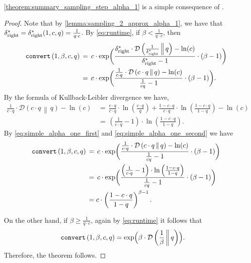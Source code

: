 \documentclass[letterpaper,11pt]{article}
\newcommand{\1}[1]{\mathds{1}\left[#1\right]}
\newcommand{\runtime}[1][\alpha, \beta, c, q]{\textnormal{\texttt{convert}}\left(#1\right)}
\newcommand{\D}[2]{\mathcal{D}\left(#1\, \middle\|\,#2 \right)}
\newcommand{\sdeltar}{\delta^{*}_{\textnormal{right}}}
\begin{document}
 \cref{theorem:summary_sampling_step_alpha_1} is a simple consequence of .
 \simpslaphaone*
\begin{proof}
	Note that by \cref{lemma:sampling_2_approx_alpha_1}, we have that $\sdeltar=\sdeltar(1,c,q) = \frac{1}{q \cdot c}$.
	By \eqref{eq:runtime}, if $\beta < \frac{1}{q \cdot c}$, then 
	\begin{equation}
		\label{eq:simple_alpha_one_first}
	\begin{aligned}
	\runtime[1,\beta,c,q]\,&=\, c \cdot \exp\biggl(\frac{ \sdeltar \cdot \D{\frac{1}{\sdeltar}}{q}- \ln(c) }{\sdeltar - 1} \cdot \left( \beta - 1 \right) \biggr) \\
	&=\,  c \cdot \exp\biggl(\frac{ \frac{1}{c\cdot q} \cdot \D{c\cdot q}{q}- \ln(c) }{\frac{1}{cq} - 1} \cdot \left( \beta - 1 \right) \biggr).
	\end{aligned}
	\end{equation}
	By the formula of Kullback-Leibler divergence we have,
 	\begin{equation}
 				\label{eq:simple_alpha_one_second}
 	\begin{aligned}\frac{1}{c\cdot q} \cdot \D{c\cdot q}{q}- \ln(c) \,&=\, \frac{ c\cdot q }{c\cdot q}\cdot \ln\left( \frac{c\cdot q}{q}\right)+ \frac{1-c\cdot q}{c\cdot q } \cdot \ln \left(\frac{1-c\cdot q}{1-q}\right)-\ln(c)
 		\\
 		&=\,\left( \frac{1}{c\cdot q}- 1\right)\cdot   \ln \left(\frac{1-c\cdot q}{1-q}\right).
 		\end{aligned}
 		\end{equation}
 		By \eqref{eq:simple_alpha_one_first} and \eqref{eq:simple_alpha_one_second} we have 
 		$$
 			\begin{aligned}
 			\runtime[1,\beta,c,q]\,
 			&=\,  c \cdot \exp\biggl(\frac{ \frac{1}{c\cdot q} \cdot \D{c\cdot q}{q}- \ln(c) }{\frac{1}{cq} - 1} \cdot \left( \beta - 1 \right) \biggr)\\
 			&=\, c \cdot \exp\biggl(\frac{ \left( \frac{1}{c\cdot q}- 1\right)\cdot   \ln \left(\frac{1-c\cdot q}{1-q}\right) }{\frac{1}{cq} - 1} \cdot \left( \beta - 1 \right) \biggr)\\
 			&= c\cdot  \left( \frac{1-c\cdot q}{1-q}\right)^{\beta-1}.
 		\end{aligned}
 		$$

	On the other hand,
	if $\beta \geq \frac{1}{q \cdot c}$, again by \eqref{eq:runtime} it follows that
	\begin{align*}
		\runtime[1,\beta,c,q] &=  \exp\Bigl(\beta \cdot \D{\frac{1}{\beta}}{q}\Bigr).
	\end{align*}
	Therefore, the theorem follows. 
\end{proof}
\end{document}
